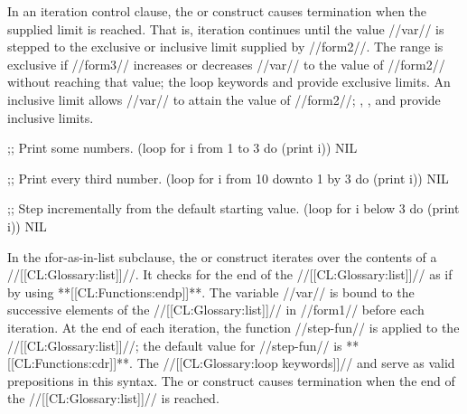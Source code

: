 \endlist
 
In an iteration control clause, the  or  construct
causes termination when the supplied limit is reached.  That is,
iteration continues until the value //var// is stepped to the
exclusive or inclusive limit supplied by //form2//.  The range is
exclusive if //form3// increases or decreases //var//
to the value of //form2// without reaching that value; the loop
keywords  and  provide exclusive limits.  An
inclusive limit allows //var// to attain the value of
//form2//; , , and  provide inclusive
limits.  




\code
;; Print some numbers.
 (loop for i from 1 to 3
       do (print i))
\EV NIL
 
;; Print every third number.
 (loop for i from 10 downto 1 by 3
       do (print i))
\EV NIL
 
;; Step incrementally from the default starting value.
 (loop for i below 3
       do (print i))
\EV NIL
\endcode
 
\endsubsubsubsubsection%

\endsubsubsubsection%


In the \i{for-as-in-list} subclause,
the  
or  construct iterates over the contents of a 
//[[CL:Glossary:list]]//.  It checks for 
the end of the //[[CL:Glossary:list]]// as if by using **[[CL:Functions:endp]]**.  
The variable //var// is bound to the successive elements  of 
the //[[CL:Glossary:list]]// in //form1// before each
iteration.  At the end of each iteration, the function //step-fun//
is applied to the //[[CL:Glossary:list]]//; the default value for //step-fun// is
**[[CL:Functions:cdr]]**.
The //[[CL:Glossary:loop keywords]]//  and  serve as valid prepositions in
this syntax.
The  or  construct causes termination when the
end of the //[[CL:Glossary:list]]// is reached.



